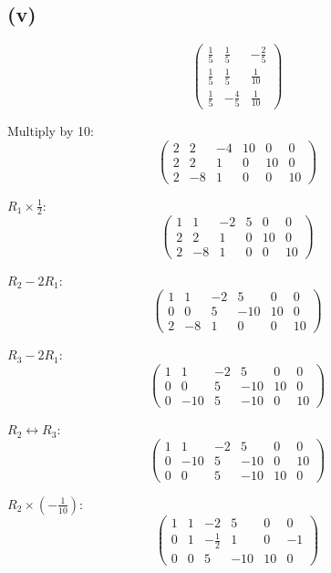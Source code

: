 \subsection*{(v)}
\[
	\begin{pmatrix}
		\frac{1}{5} & \frac{1}{5}  & -\frac{2}{5} \\
		\frac{1}{5} & \frac{1}{5}  & \frac{1}{10} \\
		\frac{1}{5} & -\frac{4}{5} & \frac{1}{10}
	\end{pmatrix}
\]

Multiply by 10:
\[
	\begin{pmatrix}
		2 & 2  & -4 & 10 & 0  & 0  \\
		2 & 2  & 1  & 0  & 10 & 0  \\
		2 & -8 & 1  & 0  & 0  & 10
	\end{pmatrix}
\]

$R_1 \times \frac{1}{2}$:
\[
	\begin{pmatrix}
		1 & 1  & -2 & 5 & 0  & 0  \\
		2 & 2  & 1  & 0 & 10 & 0  \\
		2 & -8 & 1  & 0 & 0  & 10
	\end{pmatrix}
\]

$R_2 - 2R_1$:
\[
	\begin{pmatrix}
		1 & 1   & -2 & 5   & 0  & 0  \\
		0 & 0   & 5  & -10 & 10 & 0  \\
		2 & -8 & 1  & 0 & 0  & 10
	\end{pmatrix}
\]

$R_3 - 2R_1$:
\[
	\begin{pmatrix}
		1 & 1   & -2 & 5   & 0  & 0  \\
		0 & 0   & 5  & -10 & 10 & 0  \\
		0 & -10 & 5  & -10 & 0  & 10
	\end{pmatrix}
\]

$R_2 \leftrightarrow R_3$:
\[
	\begin{pmatrix}
		1 & 1   & -2 & 5   & 0  & 0  \\
		0 & -10 & 5  & -10 & 0  & 10 \\
		0 & 0   & 5  & -10 & 10 & 0
	\end{pmatrix}
\]

$R_2 \times (-\frac{1}{10})$:
\[
	\begin{pmatrix}
		1 & 1 & -2           & 5   & 0  & 0  \\
		0 & 1 & -\frac{1}{2} & 1   & 0  & -1 \\
		0 & 0 & 5            & -10 & 10 & 0
	\end{pmatrix}
\]

